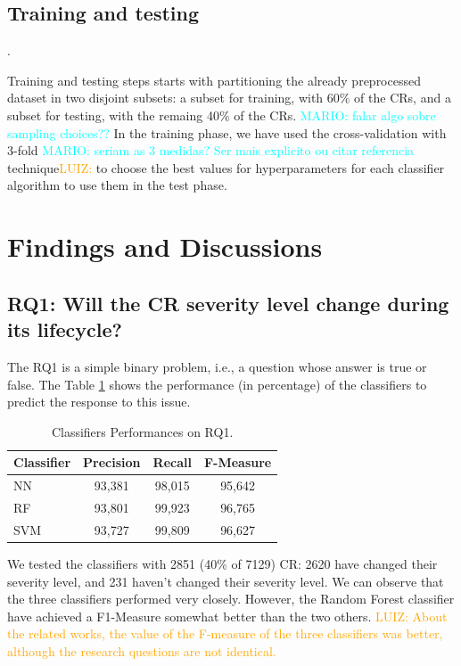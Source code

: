 \documentclass[10pt, conference]{IEEEtran}
\newcommand{\luiz}[1]{\noindent\textcolor{orange}{LUIZ: {#1}}}
\newcommand{\mario}[1]{\noindent\textcolor{cyan}{MARIO: {#1}}}
\newcommand{\luiz}[1]{}
\newcommand{\mario}[1]{}
\begin{document}
\subsection{Training and testing}.  	\label{subsec:training}

Training and testing steps starts with partitioning the already preprocessed dataset in two disjoint subsets: a subset for training, with 60\% of the CRs, and a subset for testing, with the remaing 40\% of the CRs. \mario{falar algo sobre sampling choices??} In the training phase, we have used the cross-validation with 3-fold \mario{seriam as 3 medidas? Ser mais explicito ou citar referencia} technique\luiz{\cite{Zhao2013}}to choose the best values for hyperparameters for each classifier algorithm to use them in the test phase. 


\section{Findings and Discussions}  \label{sec:discussion}

\subsection{RQ1: Will the CR severity level change during its lifecycle?}

The RQ1 is a simple binary problem, i.e., a question whose answer is true or false. The Table \ref{tab:metrics_for_rq1} shows the performance (in percentage) of the classifiers to predict the response to this issue.


\begin{table}[!ht]
	\renewcommand{\arraystretch}{1.3}
	\caption{Classifiers Performances on RQ1.}
	\label{tab:metrics_for_rq1}
	\centering
	\begin{tabular}{|l|c|c|c|}
		\hline
		Classifier & Precision & Recall & F-Measure\\
		\hline 
		NN & 93,381 & 98,015 & 95,642\\
		\hline
		RF & 93,801 & 99,923 & 96,765\\
        \hline
		SVM & 93,727 & 99,809 & 96,627 \\
		\hline
		
	\end{tabular}
\end{table}

We tested the classifiers with 2851 (40\% of 7129) CR: 2620 have changed their severity level, and 231 haven't changed their severity level. We can observe that the three classifiers performed very closely. However, the Random Forest classifier have achieved a F1-Measure somewhat better than the two others. \luiz{About the related works, the value of the F-measure of the three classifiers was better, although the research questions are not identical.}
\end{document}
